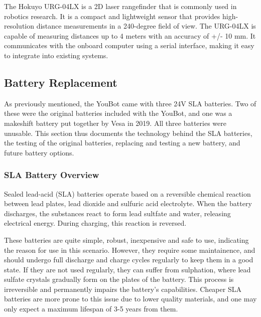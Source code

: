 \documentclass[a4paper, 12pt]{article}
\newif\ifshownotes
\newcommand{\notes}[1]{\ifshownotes\textcolor{blue}{#1}\fi}
\begin{document}
    The Hokuyo URG-04LX is a 2D laser rangefinder that is commonly used in robotics research. It is a compact and lightweight sensor that provides high-resolution distance measurements in a 240-degree field of view. The URG-04LX is capable of measuring distances up to 4 meters with an accuracy of +/- 10 mm. It communicates with the onboard computer using a serial interface, making it easy to integrate into existing systems.

    \notes{discuss installing the drivers and whatnot, and how to use it within ROS and rqt.}

   
    \pagebreak

    \subsection{Battery Replacement}
    \label{sec:battery-replacement}



    \notes{draft 1, 11.05 12pm\\
    Here are some good web pages about the Slealed Lead Acid (SLA) batteries:
https://batterymasters.co.uk/blog/post/How%
and
https://www.power-sonic.com/blog/how-to-charge-a-lead-acid-battery/
and
https://www.powerstream.com/SLA.htm}

    As previously mentioned, the YouBot came with three 24V SLA batteries. Two of these were the original batteries included with the YouBot, and one was a makeshift battery put together by Vesa in 2019. All three batteries were unusable. This section thus documents the technology behind the SLA batteries, the testing of the original batteries, replacing and testing a new battery, and future battery options. 

    \subsubsection{SLA Battery Overview}

    Sealed lead-acid (SLA) batteries operate based on a reversible chemical reaction between lead plates, lead dioxide and sulfuric acid electrolyte. When the battery discharges, the substances react to form lead sultfate and water, releasing electrical energy. During charging, this reaction is reversed.

    These batteries are quite simple, robust, inexpensive and safe to use, indicating the reason for use in this scenario. However, they require some maintainence, and should undergo full discharge and charge cycles regularly to keep them in a good state. If they are not used regularly, they can suffer from sulphation, where lead sulfate crystals gradually form on the plates of the battery. This process is irreversible and permanently impairs the battery's capabilities. Cheaper SLA batteries are more prone to this issue due to lower quality materials, and one may only expect a maximum lifespan of 3-5 years from them. 
\end{document}
